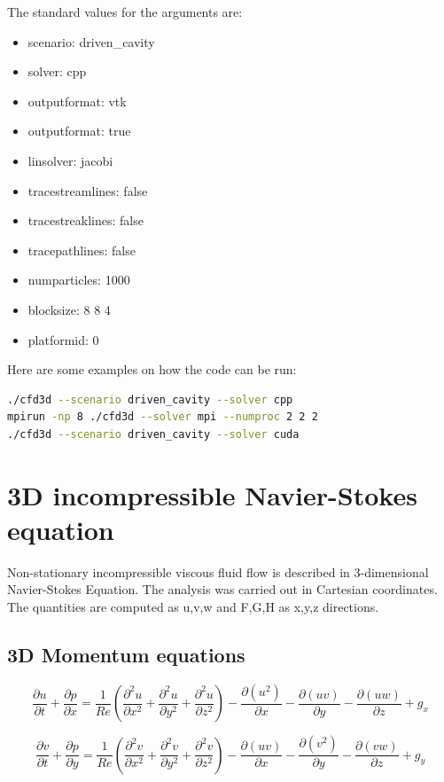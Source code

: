 \documentclass{article}%
\begin{document}
\noindent The standard values for the arguments are:
\begin{itemize}
\item scenario: driven\_cavity
\item solver: cpp
\item outputformat: vtk
\item outputformat: true
\item linsolver: jacobi
\item tracestreamlines: false
\item tracestreaklines: false
\item tracepathlines: false
\item numparticles: 1000
\item blocksize: 8 8 4
\item platformid: 0
\end{itemize}

Here are some examples on how the code can be run:
\begin{lstlisting}[language=bash, frame=single]
./cfd3d --scenario driven_cavity --solver cpp
mpirun -np 8 ./cfd3d --solver mpi --numproc 2 2 2
./cfd3d --scenario driven_cavity --solver cuda
\end{lstlisting}





\section{3D incompressible Navier-Stokes equation}
Non-stationary incompressible viscous fluid flow is described in 3-dimensional Navier-Stokes Equation. The analysis was carried out in Cartesian coordinates. The quantities are computed as u,v,w and F,G,H as x,y,z directions.

\subsection{3D Momentum equations}
\begin{equation}
\frac{\partial u}{\partial t} + \frac{\partial p}{\partial x} = 
\frac{1}{Re} \left( \frac{\partial^2 u}{\partial x^2} + \frac{\partial^2 u}{\partial y^2} + \frac{\partial^2 u}{\partial z^2} \right) - 
\frac{\partial(u^2)}{\partial x} -\frac{\partial (uv)}{\partial y} - 
\frac{\partial (uw)}{\partial z} +
g_x 
\end{equation}

\begin{equation}
\frac{\partial v}{\partial t} + \frac{\partial p}{\partial y} = 
\frac{1}{Re} \left( \frac{\partial^2 v}{\partial x^2} + \frac{\partial^2 v}{\partial y^2} + \frac{\partial^2 v}{\partial z^2} \right) - 
\frac{\partial(uv)}{\partial x} -\frac{\partial (v^2)}{\partial y} - 
\frac{\partial (vw)}{\partial z} +
g_y
\end{equation}
\end{document}

